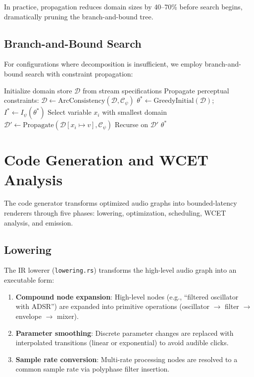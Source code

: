 \documentclass[sigchi, nonacm]{acmart}
\begin{document}
In practice, propagation reduces domain sizes by 40--70\% before search begins, dramatically pruning the branch-and-bound tree.

\subsection{Branch-and-Bound Search}

For configurations where decomposition is insufficient, we employ branch-and-bound search with constraint propagation:

\begin{algorithm}[t]
\caption{Branch-and-Bound with Psychoacoustic Pruning}
\label{alg:bnb}
\begin{algorithmic}[1]
\STATE Initialize domain store $\mathcal{D}$ from stream specifications
\STATE Propagate perceptual constraints: $\mathcal{D} \leftarrow \mathrm{ArcConsistency}(\mathcal{D}, \mathcal{C}_\psi)$
\STATE $\theta^* \leftarrow \mathrm{GreedyInitial}(\mathcal{D})$; $I^* \leftarrow I_\psi(\theta^*)$
    \STATE Select variable $x_i$ with smallest domain
        \STATE $\mathcal{D}' \leftarrow \mathrm{Propagate}(\mathcal{D}[x_i \mapsto v], \mathcal{C}_\psi)$
            \STATE Recurse on $\mathcal{D}'$
        \ENDIF
    \ENDFOR
\ENDWHILE
\RETURN $\theta^*$
\end{algorithmic}
\end{algorithm}

\section{Code Generation and WCET Analysis}
\label{sec:codegen}

The code generator transforms optimized audio graphs into bounded-latency renderers through five phases: lowering, optimization, scheduling, WCET analysis, and emission.

\subsection{Lowering}

The IR lowerer (\texttt{lowering.rs}) transforms the high-level audio graph into an executable form:

\begin{enumerate}
    \item \textbf{Compound node expansion}: High-level nodes (e.g., ``filtered oscillator with ADSR'') are expanded into primitive operations (oscillator $\to$ filter $\to$ envelope $\to$ mixer).
    \item \textbf{Parameter smoothing}: Discrete parameter changes are replaced with interpolated transitions (linear or exponential) to avoid audible clicks.
    \item \textbf{Sample rate conversion}: Multi-rate processing nodes are resolved to a common sample rate via polyphase filter insertion.
\end{enumerate}
\end{document}
